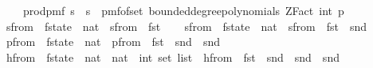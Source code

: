 \begin{isabellebody}
\ \ \ \ prod{\isacharunderscore}{\kern0pt}pmf\ {\isacharparenleft}{\kern0pt}{\isacharbraceleft}{\kern0pt}{}{\isachardot}{\kern0pt}{\isachardot}{\kern0pt}{\isacharless}{\kern0pt}s\ {\isasymtimes}\ {\isacharbraceleft}{\kern0pt}{}{\isachardot}{\kern0pt}{\isachardot}{\kern0pt}{\isacharless}{\kern0pt}s\ {\isacharparenleft}{\kern0pt}{\isasymlambda}{\isacharunderscore}{\kern0pt}{\isachardot}{\kern0pt}\ pmf{\isacharunderscore}{\kern0pt}of{\isacharunderscore}{\kern0pt}set\ {\isacharparenleft}{\kern0pt}bounded{\isacharunderscore}{\kern0pt}degree{\isacharunderscore}{\kern0pt}polynomials\ {\isacharparenleft}{\kern0pt}ZFact\ {\isacharparenleft}{\kern0pt}int\ p{\isacharparenright}{\kern0pt}{\isacharparenright}{\kern0pt}\ {}{\isacharparenright}{\kern0pt}{\isacharparenright}{\kern0pt}{\isachardoublequoteclose}\isanewline
\isanewline
\ \ \isamarkupfalse%
\ sfrom\ {\isacharcolon}{\kern0pt}{\isacharcolon}{\kern0pt}\ {\isachardoublequoteopen}f{}{\isacharunderscore}{\kern0pt}state\ {\isasymRightarrow}\ nat{\isachardoublequoteclose}\ \ {\isachardoublequoteopen}sfrom\ {\isacharequal}{\kern0pt}\ fst{\isachardoublequoteclose}\isanewline
\ \ \isamarkupfalse%
\ sfrom\ {\isacharcolon}{\kern0pt}{\isacharcolon}{\kern0pt}\ {\isachardoublequoteopen}f{}{\isacharunderscore}{\kern0pt}state\ {\isasymRightarrow}\ nat{\isachardoublequoteclose}\ \ {\isachardoublequoteopen}sfrom\ {\isacharequal}{\kern0pt}\ fst\ {\isasymcirc}\ snd{\isachardoublequoteclose}\isanewline
\ \ \isamarkupfalse%
\ p{\isacharunderscore}{\kern0pt}from\ {\isacharcolon}{\kern0pt}{\isacharcolon}{\kern0pt}\ {\isachardoublequoteopen}f{}{\isacharunderscore}{\kern0pt}state\ {\isasymRightarrow}\ nat{\isachardoublequoteclose}\ \ {\isachardoublequoteopen}p{\isacharunderscore}{\kern0pt}from\ {\isacharequal}{\kern0pt}\ fst\ {\isasymcirc}\ snd\ {\isasymcirc}\ snd{\isachardoublequoteclose}\isanewline
\ \ \isamarkupfalse%
\ h{\isacharunderscore}{\kern0pt}from\ {\isacharcolon}{\kern0pt}{\isacharcolon}{\kern0pt}\ {\isachardoublequoteopen}f{}{\isacharunderscore}{\kern0pt}state\ {\isasymRightarrow}\ {\isacharparenleft}{\kern0pt}nat\ {\isasymtimes}\ nat\ {\isasymRightarrow}\ int\ set\ list{\isacharparenright}{\kern0pt}{\isachardoublequoteclose}\ \ {\isachardoublequoteopen}h{\isacharunderscore}{\kern0pt}from\ {\isacharequal}{\kern0pt}\ fst\ {\isasymcirc}\ snd\ {\isasymcirc}\ snd\ {\isasymcirc}\ snd{\isachardoublequoteclose}\isanewline

\end{isabellebody}
